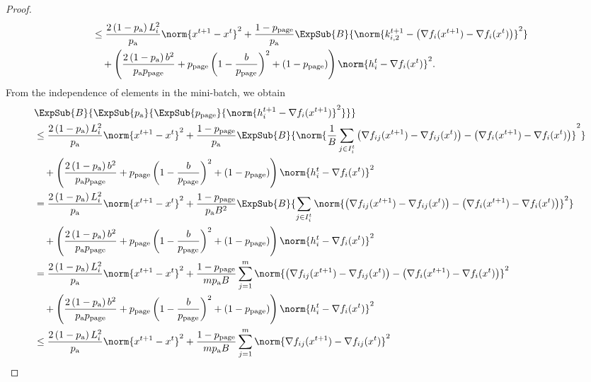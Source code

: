 \documentclass{article}
\newcommand*{\probavailable}{\ensuremath{p_{\textnormal{a}}}}
\newcommand*{\probpage}{\ensuremath{p_{\text{page}}}}
\begin{document}
\begin{proof}
\begin{align*}
    &\leq \frac{2\left(1 - \probavailable\right)L_i^2}{\probavailable} \norm{x^{t+1} - x^{t}}^2 + \frac{1 - \probpage}{\probavailable} \ExpSub{B}{\norm{k^{t+1}_{i, 2} - \left(\nabla f_i(x^{t+1}) - \nabla f_i(x^{t})\right)}^2} \\
    &\quad +\left(\frac{2\left(1 - \probavailable\right)b^2}{\probavailable \probpage} + \probpage\left(1 - \frac{b}{\probpage}\right)^2 + (1 - \probpage)\right)\norm{h^{t}_i - \nabla f_i(x^{t})}^2.
  \end{align*}
  From the independence of elements in the mini-batch, we obtain
  \begin{align*}
    &\ExpSub{B}{\ExpSub{\probavailable}{\ExpSub{\probpage}{\norm{h^{t+1}_i - \nabla f_i(x^{t+1})}^2}}} \nonumber \\
    &\leq \frac{2\left(1 - \probavailable\right)L_i^2}{\probavailable} \norm{x^{t+1} - x^{t}}^2 + \frac{1 - \probpage}{\probavailable} \ExpSub{B}{\norm{\frac{1}{B}\sum_{j \in I^t_i}\left(\nabla f_{ij}(x^{t+1}) - \nabla f_{ij}(x^{t})\right) - \left(\nabla f_i(x^{t+1}) - \nabla f_i(x^{t})\right)}^2} \\
    &\quad +\left(\frac{2\left(1 - \probavailable\right)b^2}{\probavailable \probpage} + \probpage\left(1 - \frac{b}{\probpage}\right)^2 + (1 - \probpage)\right)\norm{h^{t}_i - \nabla f_i(x^{t})}^2 \\
    &= \frac{2\left(1 - \probavailable\right)L_i^2}{\probavailable} \norm{x^{t+1} - x^{t}}^2 + \frac{1 - \probpage}{\probavailable B^2} \ExpSub{B}{\sum_{j \in I^t_i} \norm{\left(\nabla f_{ij}(x^{t+1}) - \nabla f_{ij}(x^{t})\right) - \left(\nabla f_i(x^{t+1}) - \nabla f_i(x^{t})\right)}^2} \\
    &\quad +\left(\frac{2\left(1 - \probavailable\right)b^2}{\probavailable \probpage} + \probpage\left(1 - \frac{b}{\probpage}\right)^2 + (1 - \probpage)\right)\norm{h^{t}_i - \nabla f_i(x^{t})}^2 \\
    &= \frac{2\left(1 - \probavailable\right)L_i^2}{\probavailable} \norm{x^{t+1} - x^{t}}^2 + \frac{1 - \probpage}{m \probavailable B} \sum_{j=1}^m \norm{\left(\nabla f_{ij}(x^{t+1}) - \nabla f_{ij}(x^{t})\right) - \left(\nabla f_i(x^{t+1}) - \nabla f_i(x^{t})\right)}^2 \\
    &\quad +\left(\frac{2\left(1 - \probavailable\right)b^2}{\probavailable \probpage} + \probpage\left(1 - \frac{b}{\probpage}\right)^2 + (1 - \probpage)\right)\norm{h^{t}_i - \nabla f_i(x^{t})}^2 \\
    &\leq \frac{2\left(1 - \probavailable\right)L_i^2}{\probavailable} \norm{x^{t+1} - x^{t}}^2 + \frac{1 - \probpage}{m \probavailable B} \sum_{j=1}^m \norm{\nabla f_{ij}(x^{t+1}) - \nabla f_{ij}(x^{t})}^2 \\

\end{align*}
\end{proof}
\end{document}
